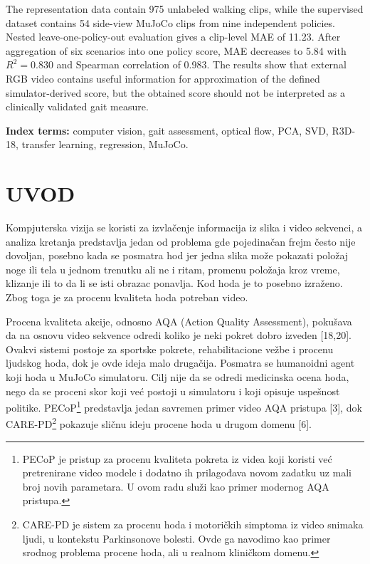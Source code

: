 ﻿\documentclass[12pt,a4paper]{report}
\begin{document}
The representation data contain 975 unlabeled walking clips, while the
supervised dataset contains 54 side-view MuJoCo clips from nine independent
policies. Nested leave-one-policy-out evaluation gives a clip-level MAE of
11.23. After aggregation of six scenarios into one policy score, MAE decreases
to 5.84 with $R^2=0.830$ and Spearman correlation of 0.983. The results show
that external RGB video contains useful information for approximation of the
defined simulator-derived score, but the obtained score should not be
interpreted as a clinically validated gait measure.

\noindent\textbf{Index terms:} computer vision, gait assessment, optical flow,
PCA, SVD, R3D-18, transfer learning, regression, MuJoCo.

\clearpage
\fi

\tableofcontents
\clearpage


\chapter{UVOD}

Kompjuterska vizija se koristi za izvla\v{c}enje informacija iz slika i video sekvenci, a
analiza kretanja predstavlja jedan od problema gde pojedinačan frejm često nije
dovoljan, posebno kada se posmatra hod jer jedna slika može pokazati položaj noge
ili tela u jednom trenutku ali ne i ritam, promenu položaja kroz vreme, klizanje
ili to da li se isti obrazac ponavlja. Kod hoda je to posebno izraženo. Zbog
toga je za procenu kvaliteta hoda potreban video.

Procena kvaliteta akcije, odnosno AQA (Action Quality Assessment), pokušava da
na osnovu video sekvence odredi koliko je neki pokret dobro izveden [18,20]. Ovakvi
sistemi postoje za sportske pokrete, rehabilitacione vežbe i procenu ljudskog
hoda, dok je ovde ideja malo drugačija. Posmatra se humanoidni agent koji hoda u
MuJoCo simulatoru. Cilj nije da se odredi medicinska ocena hoda, nego da se
proceni skor koji već postoji u simulatoru i koji opisuje uspešnost politike.
PECoP\footnote{PECoP je pristup za procenu kvaliteta pokreta iz videa koji koristi
već pretrenirane video modele i dodatno ih prilagođava novom zadatku uz mali broj
novih parametara. U ovom radu služi kao primer modernog AQA pristupa.}
predstavlja jedan savremen primer video AQA pristupa [3], dok CARE-PD\footnote{CARE-PD
je sistem za procenu hoda i motoričkih simptoma iz video snimaka ljudi, u kontekstu
Parkinsonove bolesti. Ovde ga navodimo kao primer srodnog problema procene hoda,
ali u realnom kliničkom domenu.} pokazuje sličnu ideju procene hoda u drugom domenu [6].
\end{document}
